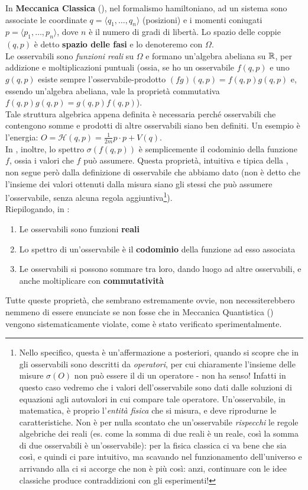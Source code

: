 \documentclass[FisicaTeorica.tex]{subfiles}
\begin{document}
In \textbf{Meccanica Classica} (\MC), nel formalismo hamiltoniano, ad un sistema sono associate le coordinate $q=\langle q_1,\dots, q_n\rangle$ (posizioni) e i momenti coniugati $p=\langle p_1,\dots, p_n\rangle$, dove $n$ è il numero di gradi di libertà. Lo spazio delle coppie $(q,p)$ è detto \textbf{spazio delle fasi} e lo denoteremo con $\Omega$.\\
Le osservabili sono \textit{funzioni reali} su $\Omega$ e formano un'algebra abeliana su $\mathbb{R}$, per addizione e moltiplicazioni puntuali (ossia, se ho un osservabile $f(q,p)$ e uno $g(q,p)$ esiste sempre l'osservabile-prodotto $(fg)(q,p)=f(q,p)g(q,p)$ e, essendo un'algebra abeliana, vale la proprietà commutativa $f(q,p)g(q,p)=g(q,p)f(q,p)$).\\
Tale struttura algebrica appena definita è necessaria perché osservabili che contengono somme e prodotti di altre osservabili siano ben definiti. Un esempio è l'energia: $O=\mathcal{H}(q,p)=\frac{1}{2m} p\cdot p+V(q)$.\\
In \MC, inoltre, lo spettro $\sigma(f(q,p))$ è semplicemente il codominio della funzione $f$, ossia i valori che $f$ può assumere. Questa proprietà, intuitiva e tipica della \MC, non segue però dalla definizione di osservabile che abbiamo dato (non è detto che l'insieme dei valori ottenuti dalla misura siano gli stessi che può assumere l'osservabile, senza alcuna regola aggiuntiva\footnote{Nello specifico, questa è un'affermazione a posteriori, quando si scopre che in \MQ gli osservabili sono descritti da \textit{operatori}, per cui chiaramente l'insieme delle misure $\sigma(O)$ non può essere il  di un operatore - non ha senso! Infatti in questo caso vedremo che i valori dell'osservabile sono dati dalle soluzioni di equazioni agli autovalori in cui compare tale operatore. Un'osservabile, in matematica, è proprio l'\textit{entità fisica} che si misura, e deve riprodurne le caratteristiche. Non è per nulla scontato che un'osservabile \textit{rispecchi} le regole algebriche dei reali (es. come la somma di due reali è un reale, così la somma di due osservabili è un'osservabile): per la fisica classica ci va bene che sia così, e quindi ci pare intuitivo, ma scavando nel funzionamento dell'universo e arrivando alla \MQ ci si accorge che non è più così: anzi, continuare con le idee classiche produce contraddizioni con gli esperimenti!}).\\ %
Riepilogando, in \MC:
\begin{enumerate}
    \item Le osservabili sono funzioni \textbf{reali}
    \item Lo spettro di un'osservabile è il \textbf{codominio} della funzione ad esso associata
    \item Le osservabili si possono sommare tra loro, dando luogo ad altre osservabili, e anche moltiplicare con \textbf{commutatività}
\end{enumerate}
Tutte queste proprietà, che sembrano estremamente ovvie, non necessiterebbero nemmeno di essere enunciate se non fosse che in Meccanica Quantistica (\MQ) vengono sistematicamente violate, come è stato verificato sperimentalmente.
\end{document}
